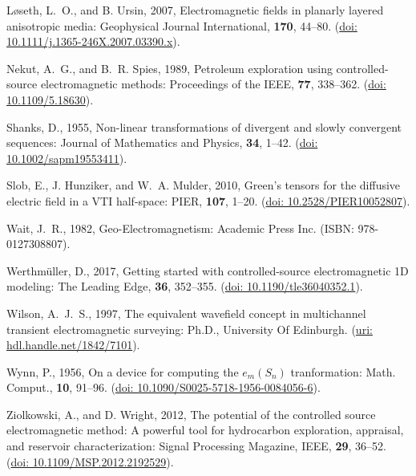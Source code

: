 \documentclass[manuscript,revised]{geophysics}
\begin{document}
\begin{thebibliography}{}
Løseth, L.~O., and B. Ursin, 2007, Electromagnetic fields in planarly layered
  anisotropic media: Geophysical Journal International, {\bf 170}, 44--80.
\newblock (\href{http://dx.doi.org/10.1111/j.1365-246X.2007.03390.x}{doi:
  10.1111/j.1365-246X.2007.03390.x}).

Nekut, A.~G., and B.~R. Spies, 1989, Petroleum exploration using
  controlled-source electromagnetic methods: Proceedings of the IEEE, {\bf 77},
  338--362.
\newblock
  (\href{http://ieeexplore.ieee.org/lpdocs/epic03/wrapper.htm?arnumber=18630}{doi:
  10.1109/5.18630}).

Shanks, D., 1955, Non-linear transformations of divergent and slowly
  convergent sequences: Journal of Mathematics and Physics, {\bf 34}, 1--42.
\newblock (\href{http://dx.doi.org/10.1002/sapm19553411}{doi:
  10.1002/sapm19553411}).

Slob, E., J. Hunziker, and W.~A. Mulder, 2010, Green's tensors for the
  diffusive electric field in a {VTI} half-space: PIER, {\bf 107}, 1--20.
\newblock (\href{http://dx.doi.org/10.2528/PIER10052807}{doi:
  10.2528/PIER10052807}).

Wait, J.~R., 1982, Geo-{E}lectromagnetism: Academic Press Inc.
\newblock ({I}SBN: 978-0127308807).

Werthmüller, D., 2017, Getting started with controlled-source electromagnetic
1D modeling: The Leading Edge, {\bf 36}, 352--355.
\newblock (\href{http://dx.doi.org/10.1190/tle36040352.1}{doi:
  10.1190/tle36040352.1}).

Wilson, A.~J.~S., 1997, The equivalent wavefield concept in multichannel
transient electromagnetic surveying: Ph.D., University Of Edinburgh.
\newblock (\href{http://hdl.handle.net/1842/7101}{uri:
hdl.handle.net/1842/7101}).

Wynn, P., 1956, {On a device for computing the $e_m(S_n)$ tranformation}:
  Math. Comput., {\bf 10}, 91--96.
\newblock (\href{http://dx.doi.org/10.1090/S0025-5718-1956-0084056-6}{doi:
  10.1090/S0025-5718-1956-0084056-6}).

Ziolkowski, A., and D. Wright, 2012, The potential of the controlled source
  electromagnetic method: A powerful tool for hydrocarbon exploration,
  appraisal, and reservoir characterization: Signal Processing Magazine, IEEE,
  {\bf 29}, 36--52.
\newblock (\href{http://dx.doi.org/10.1109/MSP.2012.2192529}{doi:
  10.1109/MSP.2012.2192529}).

\end{thebibliography}
\end{document}
